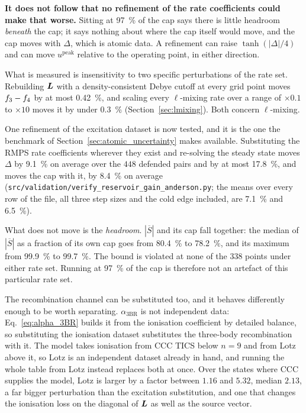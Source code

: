 \textbf{It does not follow that no refinement of the rate coefficients could
make that worse.} Sitting at
\SI{97}{\percent} of the cap says there is little headroom \emph{beneath} the
cap; it says nothing about where the cap itself would move, and the cap moves
with $\Delta$, which is atomic data. A refinement can raise
$\tanh(|\Delta|/4)$ and can move $u^{\mathrm{peak}}$ relative to the operating
point, in either direction.

What is measured is insensitivity to two specific perturbations of the rate
set. Rebuilding $\bm{L}$ with a
density-consistent Debye cutoff at every grid point moves $f_{3}-f_{4}$
by at most \SI{0.42}{\percent}, and scaling every $\ell$-mixing rate over a range
of $\times0.1$ to $\times10$ moves it by under \SI{0.3}{\percent}
(Section~\ref{sec:lmixing}). Both concern $\ell$-mixing.

One refinement of the excitation dataset is now tested, and it is the one the
benchmark of Section~\ref{sec:atomic_uncertainty} makes available. Substituting
the RMPS rate coefficients wherever they exist and re-solving the steady state
moves $\Delta$ by \SI{9.1}{\percent} on average over the $448$ defended pairs
and by at most \SI{17.8}{\percent}, and moves the cap with it, by
\SI{8.4}{\percent} on average
(\texttt{src/validation/verify\_reservoir\_gain\_anderson.py}; the means over
every row of the file, all three step sizes and the cold edge included, are
\SI{7.1}{\percent} and \SI{6.5}{\percent}).

What does not move is the \emph{headroom}. $|\overline{S}|$ and its cap fall
together: the median of $|\overline{S}|$ as a fraction of its own cap goes from
\SI{80.4}{\percent} to \SI{78.2}{\percent}, and its maximum from
\SI{99.9}{\percent} to \SI{99.7}{\percent}. The bound is violated at none of
the $338$ points under either rate set. Running at \SI{97}{\percent} of the cap
is therefore not an artefact of this particular rate set.

The recombination channel can be substituted too, and it behaves differently
enough to be worth separating. $\alpha_{\mathrm{3BR}}$ is not independent
data: Eq.~\eqref{eq:alpha_3BR} builds it from the ionisation coefficient by
detailed balance, so substituting the ionisation dataset substitutes the
three-body recombination with it. The model takes ionisation from CCC TICS
below $n=9$ and from Lotz above it, so Lotz is an independent dataset already
in hand, and running the whole table from Lotz instead replaces both at once.
Over the states where CCC supplies the model, Lotz is larger by a factor
between $1.16$ and $5.32$, median $2.13$, a far bigger perturbation than the
excitation substitution, and one that changes the ionisation loss on the
diagonal of $\bm{L}$ as well as the source vector.

